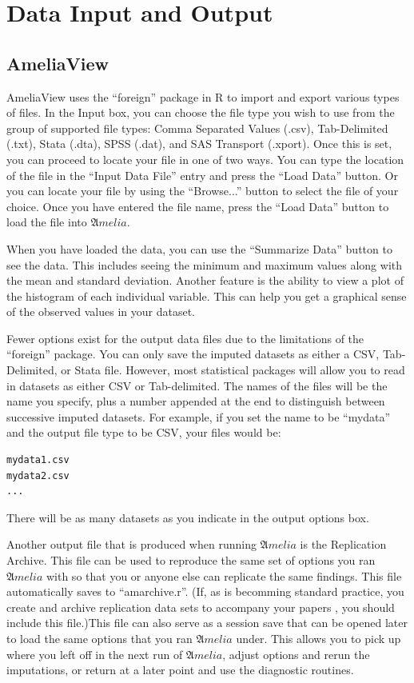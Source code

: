 \documentclass[12pt,titlepage]{article}
\begin{document}
\section{Data Input and Output}
\label{sec:data}

\subsection{AmeliaView}
\label{sec:data-gui}
AmeliaView uses the ``foreign'' package in R to import and export
various types of files.  In the Input box, you can choose the file
type you wish to use from the group of supported file types: Comma
Separated Values (.csv), Tab-Delimited (.txt), Stata (.dta), SPSS
(.dat), and SAS Transport (.xport). Once this is set, you can proceed
to locate your file in one of two ways.  You can type the location of
the file in the ``Input Data File'' entry and press the ``Load Data''
button.  Or you can locate your file by using the ``Browse...'' button
to select the file of your choice.  Once you have entered the file
name, press the ``Load Data'' button to load the file into ${\mathfrak
  Amelia}$.

When you have loaded the data, you can use the ``Summarize Data''
button to see the data.  This includes seeing the minimum and maximum
values along with the mean and standard deviation.  Another feature is
the ability to view a plot of the histogram of each individual
variable.  This can help you get a graphical sense of the observed
values in your dataset.

Fewer options exist for the output data files due to the limitations
of the ``foreign'' package.  You can only save the imputed datasets as
either a CSV, Tab-Delimited, or Stata file. However, most statistical
packages will allow you to read in datasets as either CSV or
Tab-delimited.  The names of the files will be the name you specify,
plus a number appended at the end to distinguish between successive
imputed datasets.  For example, if you set the name to be ``mydata''
and the output file type to be CSV, your files would be:
\begin{verbatim}
mydata1.csv
mydata2.csv
...
\end{verbatim}
There will be as many datasets as you indicate in the output options
box.

Another output file that is produced when running ${\mathfrak Amelia}$
is the Replication Archive.  This file can be used to reproduce the
same set of options you ran ${\mathfrak Amelia}$ with so that you or
anyone else can replicate the same findings.  This file automatically
saves to ``amarchive.r''.  (If, as is becomming standard practice, you
create and archive replication data sets to accompany your papers
\citep{King95}, you should include this file.)This file can also serve
as a session save that can be opened later to load the same options
that you ran ${\mathfrak Amelia}$ under.  This allows you to pick up
where you left off in the next run of ${\mathfrak Amelia}$, adjust
options and rerun the imputations, or return at a later point and use
the diagnostic routines.
\end{document}
